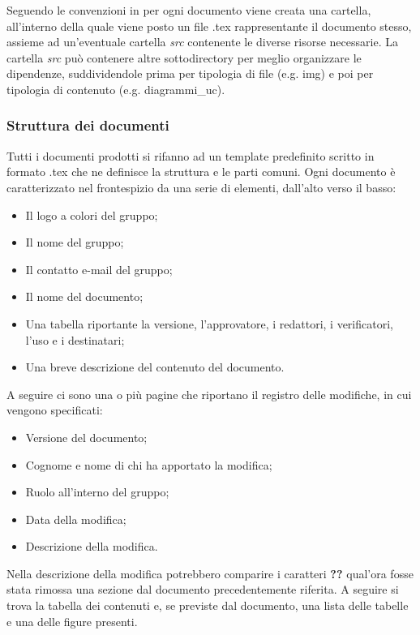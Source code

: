 Seguendo le convenzioni in  per ogni documento viene creata una cartella, all'interno della quale viene posto 
un file .tex rappresentante il documento stesso, assieme ad un'eventuale cartella \emph{src} contenente le diverse risorse necessarie.
La cartella \emph{src} può contenere altre sottodirectory per meglio organizzare le dipendenze, suddividendole prima per tipologia di file 
(e.g. img) e poi per tipologia di contenuto (e.g. diagrammi\_uc).

\subsubsection{Struttura dei documenti}
\label{ssub:struttura_doc}

Tutti i documenti prodotti si rifanno ad un template predefinito scritto in formato .tex che ne definisce la struttura 
e le parti comuni. Ogni documento è caratterizzato nel frontespizio da una serie di elementi, dall'alto verso il basso:
\begin{itemize}
    \item Il logo a colori del gruppo;
    \item Il nome del gruppo;
    \item Il contatto e-mail del gruppo;
    \item Il nome del documento;
    \item Una tabella riportante la versione, l'approvatore, i redattori, i verificatori, l'uso e i destinatari;
    \item Una breve descrizione del contenuto del documento.
\end{itemize}
A seguire ci sono una o più pagine che riportano il registro delle modifiche, in cui vengono specificati:
\begin{itemize}
    \item Versione del documento;
    \item Cognome e nome di chi ha apportato la modifica;
    \item Ruolo all'interno del gruppo;
    \item Data della modifica;
    \item Descrizione della modifica.
\end{itemize}
Nella descrizione della modifica potrebbero comparire i caratteri \textbf{??} qual'ora fosse stata rimossa una sezione dal documento 
precedentemente riferita.
A seguire si trova la tabella dei contenuti e, se previste dal documento, una lista delle tabelle e una delle figure presenti.\\
